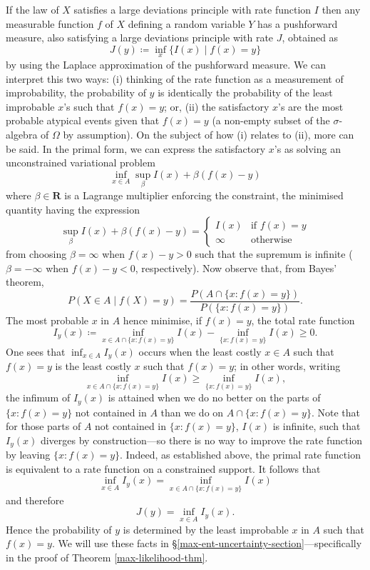\documentclass[11pt]{amsart}
\numberwithin{equation}{section}
\theoremstyle{remark}
\theoremstyle{remark}
\newcommand{\R}{\mathbf{R}}
\begin{document}
If the law of $X$ satisfies a large deviations principle with rate function $I$ then any measurable function $f$ of $X$ defining a random variable $Y$ has a pushforward measure, also satisfying a large deviations principle with rate $J$, obtained as 
\[
    J(y) \coloneqq \inf_x \{ I(x) \mid f(x) = y\}
\]
by using the Laplace approximation of the pushforward measure. We can interpret this two ways: (i) thinking of the rate function as a measurement of improbability, the probability of $y$ is identically the probability of the least improbable $x$'s such that $f(x) = y$; or, (ii) the satisfactory $x$'s are the most probable atypical events given that $f(x) = y$ (a non-empty subset of the $\sigma$-algebra of $\Omega$ by assumption). On the subject of how (i) relates to (ii), more can be said. In the primal form, we can express the satisfactory $x$'s as solving an unconstrained variational problem
\[
    \inf_{x\in A} \sup_\beta I(x) + \beta(f(x) - y)
\]
where $\beta \in \R$ is a Lagrange multiplier enforcing the constraint, the minimised quantity having the expression 
\[
    \sup_\beta I(x) + \beta(f(x) - y) = 
        \begin{cases}
            I(x) & \text{if } f(x) = y\\
            \infty & \text{otherwise}
        \end{cases}
\]
from choosing $\beta = \infty$ when $f(x) - y > 0$ such that the supremum is infinite ($\beta = -\infty$ when $f(x) - y < 0$, respectively). Now observe that, from Bayes' theorem,
\[
    P(X \in A \mid f(X) = y) = \frac{P(A \cap \{x: f(x) = y\})}{P(\{x: f(x) = y\})}.
\]
The most probable $x$ in $A$ hence minimise, if $f(x) = y$, the total rate function
\[
    I_y(x) \coloneqq \inf_{x \in A \cap \{x:f(x) = y\}} I(x) - \inf_{\{x:f(x) = y\}} I(x) \geqslant 0.
\]
One sees that $\inf_{x \in A} I_y(x)$ occurs when the least costly $x \in A$ such that $f(x) = y$ is the least costly $x$ such that $f(x) = y$; in other words, writing 
\[
    \inf_{x \in A \cap \{x:f(x) = y\}} I(x) \geqslant \inf_{\{x:f(x) = y\}} I(x),
\]
the infimum of $I_y(x)$ is attained when we do no better on the parts of $\{x : f(x) = y\}$ not contained in $A$ than we do on $A \cap \{x : f(x) = y\}$. Note that for those parts of $A$ not contained in $\{x : f(x) = y\}$, $I(x)$ is infinite, such that $I_y(x)$ diverges by construction---so there is no way to improve the rate function by leaving $\{x : f(x) = y\}$. Indeed, as established above, the primal rate function is equivalent to a rate function on a constrained support. It follows that 
\[
    \inf_{x \in A} I_y(x) = \inf_{x \in A \cap \{x:f(x) = y\}} I(x)
\]
and therefore
\[
    J(y) = \inf_{x \in A} I_y(x).
\]
Hence the probability of $y$ is determined by the least improbable $x$ in $A$ such that $f(x) = y$. We will use these facts in \S\ref{max-ent-uncertainty-section}---specifically in the proof of Theorem \ref{max-likelihood-thm}.
\end{document}
